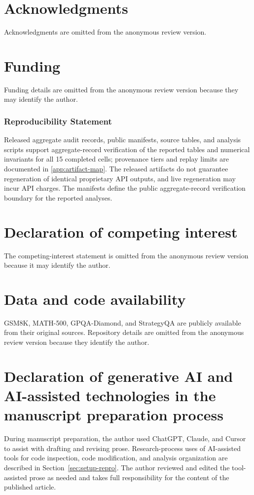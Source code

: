 \documentclass[preprint,12pt]{elsarticle}
\begin{document}
\section*{Acknowledgments}
Acknowledgments are omitted from the anonymous review version.

\section*{Funding}
Funding details are omitted from the anonymous review version because they may identify the author.

\subsubsection*{Reproducibility Statement}
Released aggregate audit records, public manifests, source tables, and analysis scripts support
aggregate-record verification of the reported tables and numerical invariants for all 15 completed
cells; provenance tiers and replay limits are documented in \ref{app:artifact-map}. The released
artifacts do not guarantee regeneration of identical proprietary API outputs, and live regeneration
may incur API charges. The manifests define the public aggregate-record verification boundary for
the reported analyses.

\section*{Declaration of competing interest}
The competing-interest statement is omitted from the anonymous review version because it may
identify the author.

\section*{Data and code availability}
GSM8K, MATH-500, GPQA-Diamond, and StrategyQA are publicly available from their original sources.
Repository details are omitted from the anonymous review version because they identify the author.

\section*{Declaration of generative AI and AI-assisted technologies in the manuscript preparation process}
During manuscript preparation, the author used ChatGPT, Claude, and Cursor to assist with drafting
and revising prose. Research-process uses of AI-assisted tools for code inspection, code
modification, and analysis organization are described in Section~\ref{sec:setup-repro}. The author
reviewed and edited the tool-assisted prose as needed and takes full responsibility for the content
of the published article.




\newpage
\appendix

\end{document}
